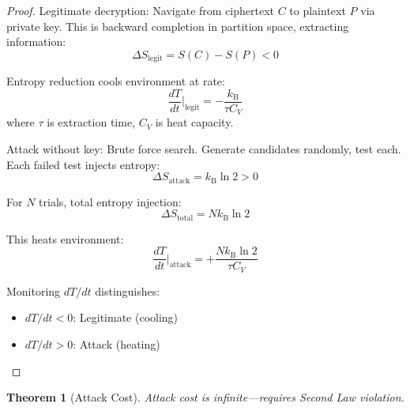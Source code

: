 \documentclass[twocolumn,10pt]{revtex4-2}
\newtheorem{theorem}{Theorem}[section]
\theoremstyle{definition}
\theoremstyle{remark}
\newcommand{\kB}{k_{\mathrm{B}}}
\begin{document}
\begin{proof}
Legitimate decryption: Navigate from ciphertext $C$ to plaintext $P$ via private key. This is backward completion in partition space, extracting information:
\begin{equation}
\Delta S_{\text{legit}} = S(C) - S(P) < 0
\end{equation}

Entropy reduction cools environment at rate:
\begin{equation}
\frac{dT}{dt}\bigg|_{\text{legit}} = -\frac{\kB}{\tau C_V}
\end{equation}
where $\tau$ is extraction time, $C_V$ is heat capacity.

Attack without key: Brute force search. Generate candidates randomly, test each. Each failed test injects entropy:
\begin{equation}
\Delta S_{\text{attack}} = \kB \ln 2 > 0
\end{equation}

For $N$ trials, total entropy injection:
\begin{equation}
\Delta S_{\text{total}} = N \kB \ln 2
\end{equation}

This heats environment:
\begin{equation}
\frac{dT}{dt}\bigg|_{\text{attack}} = +\frac{N \kB \ln 2}{\tau C_V}
\end{equation}

Monitoring $dT/dt$ distinguishes:
\begin{itemize}
\item $dT/dt < 0$: Legitimate (cooling)
\item $dT/dt > 0$: Attack (heating)
\end{itemize}
\end{proof}

\begin{theorem}[Attack Cost]
\label{thm:attack_cost}
Attack cost is infinite—requires Second Law violation.
\end{theorem}
\end{document}
